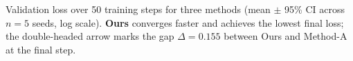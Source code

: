 \caption{Validation loss over 50 training steps for three methods (mean $\pm$ 95\% CI across $n=5$ seeds, log scale). \textbf{Ours} converges faster and achieves the lowest final loss; the double-headed arrow marks the gap $\Delta=0.155$ between Ours and Method-A at the final step.}
